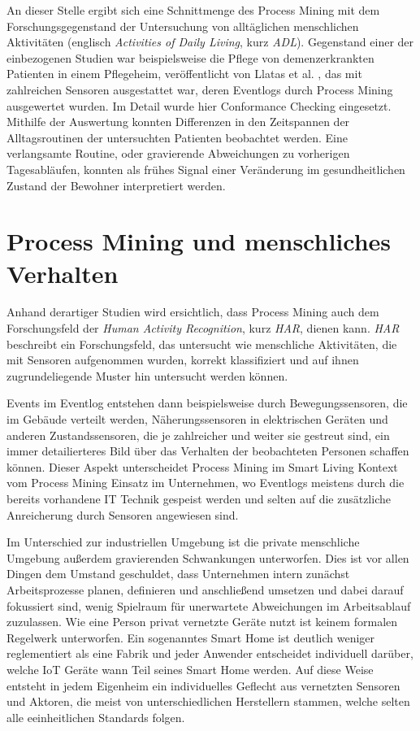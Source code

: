 An dieser Stelle ergibt sich eine Schnittmenge des Process Mining mit dem Forschungsgegenstand der Untersuchung von alltäglichen menschlichen Aktivitäten (englisch \textit{Activities of Daily Living}, kurz \textit{ADL}). 
Gegenstand einer der einbezogenen Studien war beispielsweise die Pflege von demenzerkrankten Patienten in einem Pflegeheim, veröffentlicht von Llatas et al. \cite{llatas}, das mit zahlreichen Sensoren ausgestattet war, deren Eventlogs durch Process Mining ausgewertet wurden. Im Detail wurde hier Conformance Checking eingesetzt. Mithilfe der Auswertung konnten  Differenzen in den Zeitspannen der Alltagsroutinen der untersuchten Patienten beobachtet werden. Eine verlangsamte Routine, oder gravierende Abweichungen zu vorherigen Tagesabläufen, konnten als frühes Signal einer Veränderung im gesundheitlichen Zustand der Bewohner interpretiert werden.

\section{Process Mining und menschliches Verhalten}\label{har}
Anhand derartiger Studien wird ersichtlich, dass Process Mining auch dem Forschungsfeld der \textit{Human Activity Recognition}, kurz \textit{HAR}, dienen kann. \textit{HAR} beschreibt ein Forschungsfeld, das untersucht wie menschliche Aktivitäten, die mit Sensoren aufgenommen wurden, korrekt klassifiziert und auf ihnen zugrundeliegende Muster hin untersucht werden können. 

Events im Eventlog entstehen dann beispielsweise durch Bewegungssensoren, die im Gebäude verteilt werden, Näherungssensoren in elektrischen Geräten und anderen Zustandssensoren, die je zahlreicher und weiter sie gestreut sind, ein immer detailierteres Bild über das Verhalten der beobachteten Personen schaffen können. 
Dieser Aspekt unterscheidet Process Mining im Smart Living Kontext vom Process Mining Einsatz im Unternehmen, wo Eventlogs meistens durch die bereits vorhandene IT Technik gespeist werden und selten auf die zusätzliche Anreicherung durch Sensoren angewiesen sind.
 
Im Unterschied zur industriellen Umgebung ist die private menschliche Umgebung außerdem gravierenden Schwankungen unterworfen. Dies ist vor allen Dingen dem Umstand geschuldet, dass Unternehmen intern zunächst Arbeitsprozesse planen, definieren und anschließend umsetzen und dabei darauf fokussiert sind, wenig Spielraum für unerwartete Abweichungen im Arbeitsablauf zuzulassen. 
Wie eine Person privat vernetzte Geräte nutzt ist keinem formalen Regelwerk unterworfen. Ein sogenanntes Smart Home ist deutlich weniger reglementiert als eine Fabrik und jeder Anwender entscheidet individuell darüber, welche IoT Geräte wann Teil seines Smart Home werden. Auf diese Weise entsteht in jedem Eigenheim ein individuelles Geflecht aus vernetzten Sensoren und Aktoren, die meist von unterschiedlichen Herstellern stammen, welche selten alle eeinheitlichen Standards folgen.

